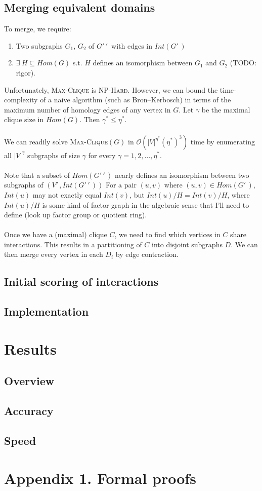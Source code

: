 \documentclass[11pt]{article}
\begin{document}
\subsection*{Merging equivalent domains}

To merge, we require:
\begin{enumerate}
\item Two subgraphs $G_1$, $G_2$ of $G'\,\!'\,\!$ with edges in $Int(G'\,\!)$
\item $\exists \: H \subseteq Hom(G)$ s.t. $H$ defines an isomorphism between $G_1$ and $G_2$ (TODO: rigor).
\end{enumerate}
Unfortunately, \textsc{Max-Clique} is \textsc{NP-Hard}. However, we can bound the time-complexity of a naive algorithm (such as Bron--Kerbosch) in terms of the maximum number of homology edges of any vertex in $G$. Let $\gamma$ be the maximal clique size in $Hom(G)$. Then $\gamma^* \leq \eta^*$.\\\\
We can readily solve \textsc{Max-Clique}$(G)$ in $\mathcal O(|V|^{\eta^*}(\eta^*)^3)$ time by enumerating all $|V|^{\gamma}$ subgraphs of size $\gamma$ for every $\gamma = 1, 2, \ldots, \eta^*$.\\\\
Note that a subset of $Hom(G'\,\!'\,\!)$ nearly defines an isomorphism between two subgraphs of $(V'\,\!, Int(G'\,\!'\,\!))$ For a pair $(u,v)$ where $(u,v) \in Hom(G'\,\!)$, $Int(u)$ may not exactly equal $Int(v)$, but $Int(u) / H = Int(v) / H$, where $Int(u) / H$ is some kind of factor graph in the algebraic sense that I'll need to define (look up factor group or quotient ring).\\\\
Once we have a (maximal) clique $C$, we need to find which vertices in $C$ share interactions. This results in a partitioning of $C$ into disjoint subgraphs $D$. We can then merge every vertex in each $D_i$ by edge contraction.

\subsection*{Initial scoring of interactions}

\subsection*{Implementation}

\section*{Results}

\subsection*{Overview}

\subsection*{Accuracy}

\subsection*{Speed}

\section*{Appendix 1. Formal proofs}
\end{document}
